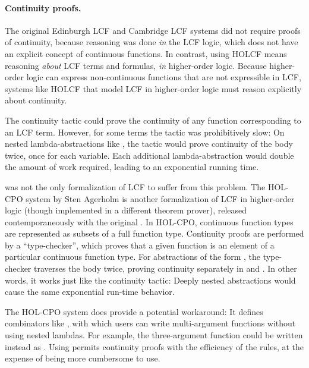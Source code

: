 \paragraph{Continuity proofs.} The original Edinburgh LCF and Cambridge LCF systems \cite{GMW79, paulson87lcf} did not require proofs of continuity, because reasoning was done \emph{in} the LCF logic, which does not have an explicit concept of continuous functions. In contrast, using HOLCF means reasoning \emph{about} LCF terms and formulas, \emph{in} higher-order logic. Because higher-order logic can express non-continuous functions that are not expressible in LCF, systems like HOLCF that model LCF in higher-order logic must reason explicitly about continuity.

The  continuity tactic could prove the continuity of any function corresponding to an LCF term. However, for some terms the tactic was prohibitively slow: On nested lambda-abstractions like , the tactic would prove continuity of the body twice, once for each variable. Each additional lambda-abstraction would double the amount of work required, leading to an exponential running time.

 was not the only formalization of LCF to suffer from this problem. The HOL-CPO system by Sten Agerholm \cite{agerholm94thesis} is another formalization of LCF in higher-order logic (though implemented in a different theorem prover), released contemporaneously with the original . In HOL-CPO, continuous function types are represented as subsets of a full function type. Continuity proofs are performed by a ``type-checker'', which proves that a given function is an element of a particular continuous function type. For abstractions of the form , the type-checker traverses the body twice, proving continuity separately in  and  \cite[\S5.2.2]{agerholm94thesis}. In other words, it works just like the  continuity tactic: Deeply nested abstractions would cause the same exponential run-time behavior.

The HOL-CPO system does provide a potential workaround: It defines combinators like , with which users can write multi-argument functions without using nested lambdas. For example, the three-argument function  could be written instead as \isa{curry (curry (\<lambda>p. e[fst (fst p), snd} \isa{(fst p), snd p]))}. Using  permits continuity proofs with the efficiency of the   rules, at the expense of being more cumbersome to use.

